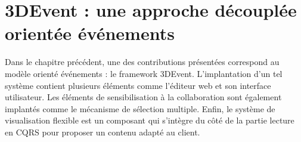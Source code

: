 



\section{3DEvent : une approche découplée orientée événements}
Dans le chapitre précédent, une des contributions présentées correspond au 
modèle orienté événements : le \gls{framework} 3DEvent. 
L'implantation d'un tel système contient plusieurs éléments comme l'éditeur 
web et son interface utilisateur. Les éléments de sensibilisation à la collaboration 
sont également implantés comme le mécanisme de sélection multiple. Enfin, le 
système de visualisation flexible est un composant qui s'intègre du côté de la 
partie lecture en \gls{CQRS} pour proposer un contenu adapté au client. 



